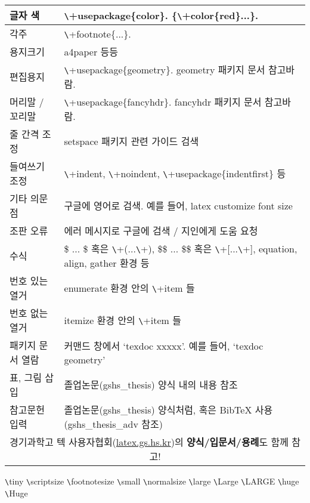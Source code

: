 \documentclass[11pt]{article}
\begin{document}
\begin{table}[h]
\begin{tabular}{|p{}|p{}|}
		\hline
		글자 색 & \verb+\+usepackage\{color\}. \{\verb+\+color\{red\}...\}. \\
		\hline
		각주 & \verb+\+footnote\{...\}.  \\
		\hline
		용지크기 & a4paper 등등 \\
		\hline
		편집용지 & \verb+\+usepackage\{geometry\}. geometry 패키지 문서 참고바람. \\
		\hline
		머리말 / 꼬리말 & \verb+\+usepackage\{fancyhdr\}. fancyhdr 패키지 문서 참고바람. \\
		\hline
		\hline
		줄 간격 조정 & setspace 패키지 관련 가이드 검색 \\
		\hline
		들여쓰기 조정 & \verb+\+indent, \verb+\+noindent,  \verb+\+usepackage\{indentfirst\} 등 \\
		\hline
		기타 의문점 & 구글에 영어로 검색. 예를 들어, latex customize font size \\
		\hline
		조판 오류 & 에러 메시지로 구글에 검색 / 지인에게 도움 요청 \\
		\hline
		수식 & \$ ... \$ 혹은 \verb+\+(...\verb+\+), \$\$ ... \$\$ 혹은 \verb+\+[...\verb+\+], equation, align, gather 환경 등 \\
		\hline
		번호 있는 열거 & enumerate 환경 안의 \verb+\+item 들\\
		\hline
		번호 없는 열거 & itemize 환경 안의 \verb+\+item 들 \\
		\hline
		패키지 문서 열람 & 커맨드 창에서 `texdoc xxxxx'. 예를 들어, `texdoc geometry' \\
		\hline
		표, 그림 삽입 & 졸업논문(gshs\_thesis) 양식 내의 내용 참조 \\
		\hline
		참고문헌 입력 & 졸업논문(gshs\_thesis) 양식처럼, 혹은 BibTeX 사용(gshs\_thesis\_adv 참조) \\
		\hline
		\multicolumn{2}{|c|}{경기과학고 텍 사용자협회(\url{latex.gs.hs.kr})의 \textbf{양식/입문서/용례}도 함께 참고!} \\
		\hline
	\end{tabular}
\end{table}
{\tiny \verb+\+tiny} {\scriptsize \verb+\+scriptsize} {\footnotesize \verb+\+footnotesize} {\small \verb+\+small} {\normalsize \verb+\+normalsize} {\large \verb+\+large} {\Large \verb+\+Large} {\LARGE \verb+\+LARGE} {\huge \verb+\+huge} {\Huge \verb+\+Huge}
\end{document}
